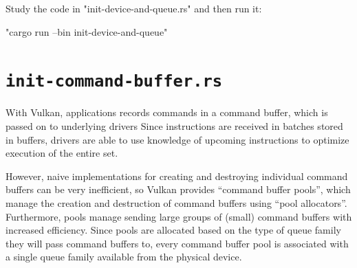 \documentclass[12pt,letterpaper]{article}
\newcommand{\inquotes}[1]{``#1''}	%
\begin{document}
	Study the code in "init-device-and-queue.rs" and then run it:
    	\begin{center}
    		"cargo run --bin init-device-and-queue"
    	\end{center}
      
\section{\texttt{init-command-buffer.rs}}
	With Vulkan, applications records commands in a command buffer, which is passed on to underlying drivers Since instructions are received in batches stored in buffers, drivers are able to use knowledge of upcoming instructions to optimize execution of the entire set. 
    
	However, naive implementations for creating and destroying individual command buffers can be very inefficient, so Vulkan provides \inquotes{command buffer pools}, which manage the creation and destruction of command buffers using \inquotes{pool allocators}. Furthermore, pools manage sending large groups of (small) command buffers with increased efficiency. Since pools are allocated based on the type of queue family they will pass command buffers to, every command buffer pool is associated with a single queue family available from the physical device.
	
\end{document}
